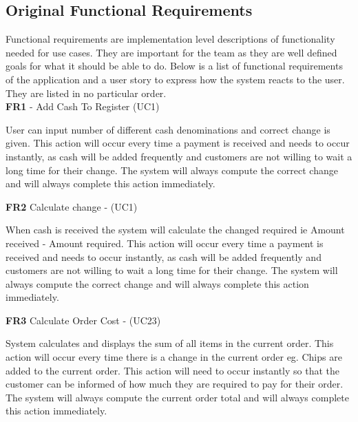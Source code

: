 \subsection{Original Functional Requirements}
Functional requirements are implementation level descriptions of functionality needed for use cases. They are important for the team as they are well defined goals for what it should be able to do. Below is a list of functional requirements of the application and a user story to express how the system reacts to the user. They are listed in no particular order. \\



\noindent \textbf{FR1} - Add Cash To Register (UC1)\\
\begin{small}
	User can input number of different cash denominations and correct change is given. This action will occur every time a payment is received and needs to occur instantly, as cash will be added frequently and customers are not willing to wait a long time for their change. The system will always compute the correct change and will always complete this action immediately. \\
\end{small}
\linebreak

\noindent \textbf{FR2} Calculate change -  (UC1)\\
\begin{small}
	When cash is received the system will calculate the changed required ie Amount received - Amount required. This action will occur every time a payment is received and needs to occur instantly, as cash will be added frequently and customers are not willing to wait a long time for their change. The system will always compute the correct change and will always complete this action immediately. \\
\end{small}
\linebreak

\noindent \textbf{FR3} Calculate Order Cost - (UC23)\\
\begin{small}
	System calculates and displays the sum of all items in the current order. This action will occur every time there is a change in the current order eg. Chips are added to the current order. This action will need to occur instantly so that the customer can be informed of how much they are required to pay for their order. The system will always compute the current order total and will always complete this action immediately.\\
\end{small}
\linebreak



